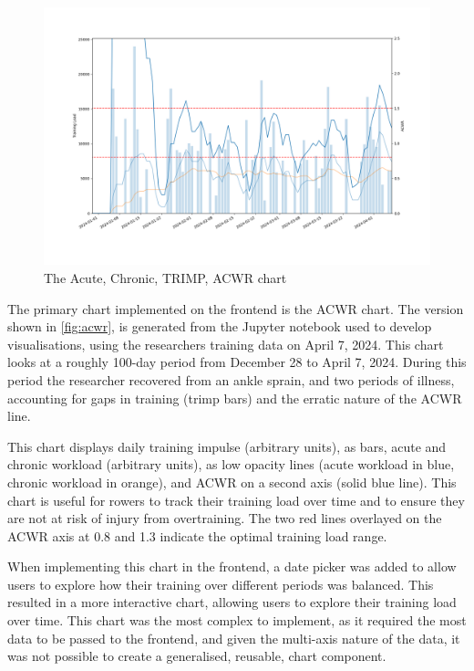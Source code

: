\begin{figure}[htbp]
  \centering
  \includegraphics[width=\linewidth]{figures/acwr.png}
  \captionsetup{justification=centering}
  \caption[ACWR Chart]{\label{fig:acwr}The Acute, Chronic, TRIMP, ACWR chart}
\end{figure}
The primary chart implemented on the frontend is the ACWR chart. The version shown in \autoref{fig:acwr}, is generated from the Jupyter notebook used to develop visualisations, using the researchers training data on April 7, 2024. This chart looks at a roughly 100-day period from December 28 to April 7, 2024. During this period the researcher recovered from an ankle sprain, and two periods of illness, accounting for gaps in training (trimp bars) and the erratic nature of the ACWR line.

This chart displays daily training impulse (arbitrary units), as bars, acute and chronic workload (arbitrary units), as low opacity lines (acute workload in blue, chronic workload in orange), and ACWR on a second axis (solid blue line). This chart is useful for rowers to track their training load over time and to ensure they are not at risk of injury from overtraining. The two red lines overlayed on the ACWR axis at 0.8 and 1.3 indicate the optimal training load range. 

When implementing this chart in the frontend, a date picker was added to allow users to explore how their training over different periods was balanced. This resulted in a more interactive chart, allowing users to explore their training load over time. This chart was the most complex to implement, as it required the most data to be passed to the frontend, and given the multi-axis nature of the data, it was not possible to create a generalised, reusable, chart component.

